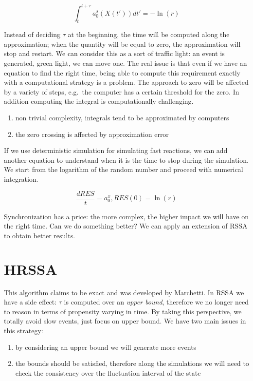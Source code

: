 $$\int_t^{t+\tau}a_0^s (X(t')) dt' = - \ln(r)$$

Instead of deciding $\tau$ at the beginning, the time will be computed along the approximation; when the quantity will be equal to zero, the approximation will stop and restart.
We can consider this as a sort of traffic light: an event is generated, green light, we can move one.
The real issue is that even if we have an equation to find the right time, being able to compute this requirement exactly with a computational strategy is a problem.
The approach to zero will be affected by a variety of steps, e.g.~the computer has a certain threshold for the zero.
In addition computing the integral is computationally challenging.

\begin{enumerate}
  \def\labelenumi{\arabic{enumi}.}
  \item non trivial complexity, integrals tend to be approximated by computers
  \item the zero crossing is affected by approximation error
\end{enumerate}

If we use deterministic simulation for simulating fast reactions, we can add another equation to understand when it is the time to stop during the simulation.
We start from the logarithm of the random number and proceed with numerical integration.

$$\frac{dRES}{t}= a_0^x,RES(0)= \ln(r)$$

Synchronization has a price: the more complex, the higher impact we will have on the right time.
Can we do something better? We can apply an extension of RSSA to obtain better results.

\section{HRSSA}
This algorithm claims to be exact and was developed by Marchetti.
In RSSA we have a side effect: $\tau$ is computed over an \emph{upper bound}, therefore we no longer need to reason in terms of propensity varying in time.
By taking this perspective, we totally avoid slow events, just focus on upper bound.
We have two main issues in this strategy:

\begin{enumerate}
  \def\labelenumi{\arabic{enumi}.}
  \item by considering an upper bound we will generate more events
  \item the bounds should be satisfied, therefore along the simulations we will need to check the consistency over the fluctuation interval of the state
\end{enumerate}

